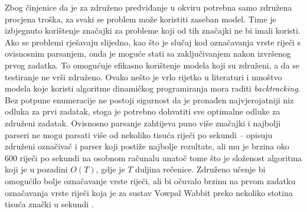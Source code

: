 Zbog činjenice da je za združeno predviđanje u okviru \lts{} potrebna samo
združena procjena troška, za svaki se problem može koristiti zaseban model. Time
je izbjegnuto korištenje značajki za probleme koji od tih značajki ne bi imali
koristi. Ako se problemi rješavaju slijedno, kao što je slučaj kod označavanja
vrste riječi s ovisnosnim parsanjem, onda je moguće stati sa zaključivanjem
nakon izvršenog prvog zadatka. To omogućuje efikasno korištenje modela koji su
združeni, a da se testiranje ne vrši združeno. Ovako nešto je vrlo rijetko u
literaturi i mnoštvo modela koje koristi algoritme dinamičkog programiranja mora
raditi \textit{backtracking}. Bez potpune enumeracije ne postoji sigurnost da je
pronađen najvjerojatniji niz odluka za prvi zadatak, stoga je potrebno dohvatiti
sve optimalne odluke za združeni zadatak. Ovisnosno parsanje zahtijeva puno
više značajki i najbolji parseri ne mogu parsati više od nekoliko tisuća
riječi po sekundi -- \citet{andor2016globally} opisuju združeni označivač i
parser koji postiže najbolje rezultate, ali mu je brzina oko 600 riječi po
sekundi na osobnom računalu unatoč tome što je složenost algoritma koji je u
pozadini $O(T)$, gdje je $T$ duljina rečenice. Združeno učenje bi omogućilo
bolje označavanje vrste riječi, ali bi očuvalo brzinu na prvom zadatku
označavanja vrste riječi koja je za sustav Vowpal Wabbit preko nekoliko stotina
tisuća znački u sekundi \citep{daume14lts}.
